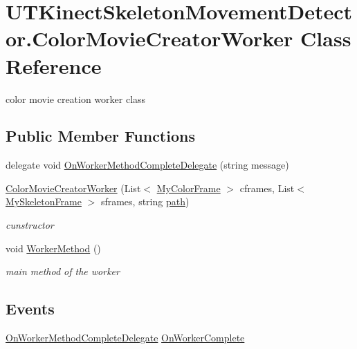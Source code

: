 \hypertarget{classUTKinectSkeletonMovementDetector_1_1ColorMovieCreatorWorker}{\section{U\-T\-Kinect\-Skeleton\-Movement\-Detector.\-Color\-Movie\-Creator\-Worker Class Reference}
\label{classUTKinectSkeletonMovementDetector_1_1ColorMovieCreatorWorker}
}


color movie creation worker class  


\subsection*{Public Member Functions}
\begin{DoxyCompactItemize}
\item 
delegate void \hyperlink{classUTKinectSkeletonMovementDetector_1_1ColorMovieCreatorWorker_a5bb43499cb3485ff2cc4a139b5f77050}{On\-Worker\-Method\-Complete\-Delegate} (string message)
\item 
\hyperlink{classUTKinectSkeletonMovementDetector_1_1ColorMovieCreatorWorker_a6fa202da9a18d6af550a497cc42378fe}{Color\-Movie\-Creator\-Worker} (List$<$ \hyperlink{classUTKinectSkeletonMovementDetector_1_1MyColorFrame}{My\-Color\-Frame} $>$ cframes, List$<$ \hyperlink{classUTKinectSkeletonMovementDetector_1_1MySkeletonFrame}{My\-Skeleton\-Frame} $>$ sframes, string \hyperlink{classUTKinectSkeletonMovementDetector_1_1ColorMovieCreatorWorker_ace4d34d6ac732c41710967fdcda28b5a}{path})
\begin{DoxyCompactList}\small\item\em cunstructor \end{DoxyCompactList}\item 
void \hyperlink{classUTKinectSkeletonMovementDetector_1_1ColorMovieCreatorWorker_aff3022fbab201ec116d79bdb0a1e6d21}{Worker\-Method} ()
\begin{DoxyCompactList}\small\item\em main method of the worker \end{DoxyCompactList}\end{DoxyCompactItemize}
\subsection*{Events}
\begin{DoxyCompactItemize}
\item 
\hyperlink{classUTKinectSkeletonMovementDetector_1_1ColorMovieCreatorWorker_a5bb43499cb3485ff2cc4a139b5f77050}{On\-Worker\-Method\-Complete\-Delegate} \hyperlink{classUTKinectSkeletonMovementDetector_1_1ColorMovieCreatorWorker_aa3e3f57176cf63366e90893f7095aa83}{On\-Worker\-Complete}
\end{DoxyCompactItemize}
